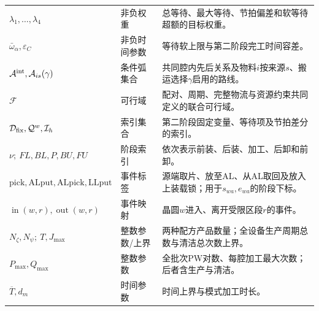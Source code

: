 \documentclass[final,5p,times,twocolumn]{elsarticle}
\begin{document}
\begin{table}[t]
\begin{tabular}{C{0.20\textwidth}C{0.16\textwidth}C{0.43\textwidth}}
$\lambda_1,\ldots,\lambda_4$ & 非负权重 & 总等待、最大等待、节拍偏差和软等待超额的目标权重。\\
$\bar\omega_\alpha,\varepsilon_C$ & 非负时间参数 & 等待软上限与第二阶段完工时间容差。\\
$\mathcal A^{\rm int},\mathcal A_{is}(\gamma)$ & 条件弧集合 & 共同腔内先后关系及物料$i$按来源$s$、搬运选择$\gamma$启用的路线。\\
$\mathcal F$ & 可行域 & 配对、周期、完整物流与资源约束共同定义的联合可行域。\\
$\mathcal D_{\rm fix},\mathcal Q^w,\mathcal I_h$ & 索引集合 & 第二阶段固定变量、等待项及节拍差分的索引。\\
$\nu;\ FL,BL,P,BU,FU$ & 阶段索引 & 依次表示前装、后装、加工、后卸和前卸。\\
$\mathrm{pick,ALput,ALpick,LLput}$ & 事件标签 & 源端取片、放至AL、从AL取回及放入上装载锁；用于$s_{wa},e_{wa}$的阶段下标。\\
$\operatorname{in}(w,r),\operatorname{out}(w,r)$ & 事件映射 & 晶圆$w$进入、离开受限区段$r$的事件。\\
$N_{\zeta},N_{\psi};\ T,J_{\max}$ & 整数参数/上界 & 两种配方产品数量；全设备生产周期总数与清洁总次数上界。\\
$P_{\max},Q_{\max}$ & 整数参数 & 全批次PW对数、每腔加工最大次数；后者含生产与清洁。\\
$\overline T,d_m$ & 时间参数 & 时间上界与模式加工时长。\\
\bottomrule
\end{tabular}
\end{table}
\end{document}
